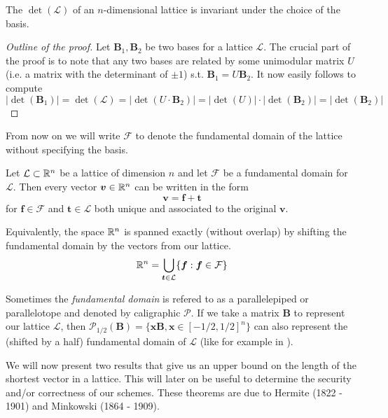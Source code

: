 \begin{proposition}
    The $\det (\mathcal{L})$ of an $n$-dimensional lattice is invariant under the choice of the basis.
\end{proposition}

\begin{proof}[Outline of the proof]
    Let $\bm{B}_1, \bm{B}_2$ be two bases for a lattice $\mathcal{L}$. The crucial part of the proof is to note that any two bases are related by some unimodular matrix $U$ (i.e. a matrix with the determinant of $\pm 1$) s.t. $\bm{B}_1 = U \bm{B}_2$. It now easily follows to compute $| \det (\bm{B}_1) | = \det (\mathcal{L}) = | \det (U \cdot \bm{B}_2) | = | \det(U) | \cdot | \det(\bm{B}_2) | = | \det(\bm{B}_2)|$ 
\end{proof}

From now on we will write $\mathcal{F}$ to denote the fundamental domain of the lattice without specifying the basis.

\begin{proposition}
    Let $\mathcal{L} \subset \mathbb{R}^n$ be a lattice of dimension $n$ and let $\mathcal{F}$ be a fundamental domain for $\mathcal{L}$. Then every vector $\boldsymbol{v} \in \mathbb{R}^n$ can be written in the form 
    $$\bm{v} = \bm{f} + \bm{t}$$
    for $\bm{f} \in \mathcal{F}$ and $\bm{t} \in \mathcal{L}$ both unique and associated to the original $\bm{v}$.
\end{proposition}

Equivalently, the space $\mathbb{R}^n$ is spanned exactly (without overlap) by shifting the fundamental domain by the vectors from our lattice.
$$ \mathbb{R}^n = \bigcup_{\boldsymbol{t} \in \mathcal{L}} \{\boldsymbol{f} : \boldsymbol{f} \in \mathcal{F} \}$$

\begin{remark}
    Sometimes the \textit{fundamental domain} is refered to as a parallelepiped or parallelotope and denoted by caligraphic $\mathcal{P}$. If we take a matrix $\bm{B}$ to represent our lattice $\mathcal{L}$, then $\mathcal{P}_{1/2}(\bm{B}) = \{\bm{x}\bm{B}, \bm{x} \in [-1/2, 1/2]^n \}$ can also represent the (shifted by a half) fundamental domain of $\mathcal{L}$ (like for example in \cite{gentry}).
\end{remark}
\iffalse
We will now present two results that give us an upper bound on the length of the shortest vector in a lattice. This will later on be useful to determine the security and/or correctness of our schemes. These theorems are due to Hermite (1822 - 1901) and Minkowski (1864 - 1909).

